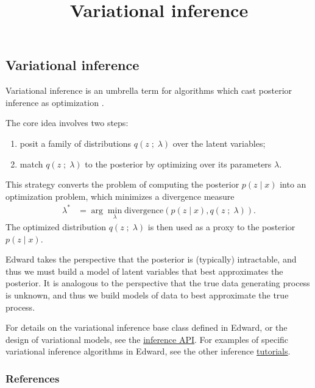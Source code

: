 \title{Variational inference}

\subsection{Variational inference}

Variational inference is an umbrella term for algorithms which cast
posterior inference as optimization
\citep{hinton1993keeping,waterhouse1996bayesian,jordan1999introduction}.

The core idea involves two steps:
\begin{enumerate}
   \item posit a family of distributions $q(z\;;\;\lambda)$ over the
   latent variables;
   \item match $q(z\;;\;\lambda)$ to the posterior by optimizing over its
   parameters $\lambda$.
 \end{enumerate}
This strategy converts the problem of computing the posterior $p(z \mid x)$ into
an optimization problem, which minimizes a divergence measure
\begin{align*}
  \lambda^*
  &=
  \arg\min_\lambda \text{divergence}(
  p(z \mid x)
  ,
  q(z\;;\;\lambda)
  ).
\end{align*}
The optimized distribution $q(z\;;\;\lambda)$ is then used as a
proxy to the posterior $p(z\mid x)$.

Edward takes the perspective that the posterior is (typically)
intractable, and thus we must build a model of latent variables that
best approximates the posterior.
It is analogous to the perspective
that the true data generating process is unknown, and thus we build
models of data to best approximate the true process.

For details on the variational inference base class defined in Edward,
or the design of variational models, see the
\href{/api/inference}{inference API}.
For examples of specific variational inference algorithms in
Edward, see the other inference \href{/tutorials/}{tutorials}.

\subsubsection{References}\label{references}

